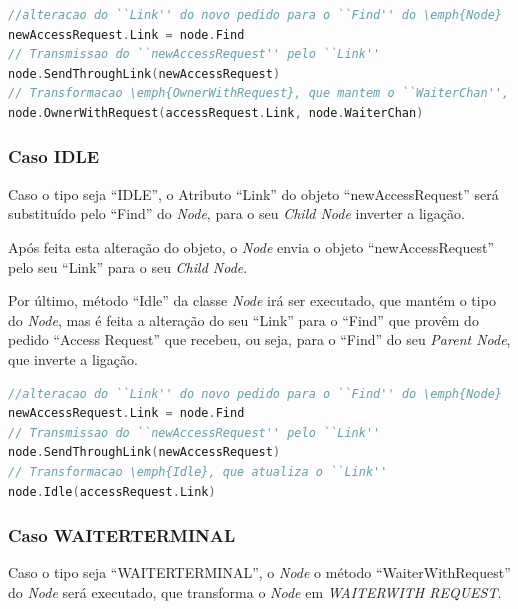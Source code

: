 \begin{lstlisting}[caption={Comportamento do \emph{Node} tipo \emph{Owner With Request} caso receba um pedido \emph{Access Request} no \emph{Channel ``Find''}},language=Go]
//alteracao do ``Link'' do novo pedido para o ``Find'' do \emph{Node}
newAccessRequest.Link = node.Find 
// Transmissao do ``newAccessRequest'' pelo ``Link''
node.SendThroughLink(newAccessRequest) 
// Transformacao \emph{OwnerWithRequest}, que mantem o ``WaiterChan'', mas atualiza o ``Link''
node.OwnerWithRequest(accessRequest.Link, node.WaiterChan)
\end{lstlisting}



\subsubsection*{Caso IDLE}
Caso o tipo seja ``IDLE'',
o Atributo ``Link'' do objeto ``newAccessRequest'' será substituído pelo ``Find'' do \emph{Node}, para o seu \emph{Child Node} inverter a ligação.

Após feita esta alteração do objeto, o \emph{Node} envia o objeto ``newAccessRequest'' pelo seu ``Link'' para o seu \emph{Child Node}.

Por último,  método ``Idle'' da classe \emph{Node} irá ser executado, que mantém o tipo do \emph{Node}, mas
é feita a alteração do seu ``Link'' para o ``Find'' que provêm do pedido ``Access Request'' que recebeu, ou seja, para o ``Find'' do seu \emph{Parent Node}, 
que inverte a ligação.


\begin{lstlisting}[caption={Comportamento do \emph{Node} tipo \emph{Idle} caso receba um pedido \emph{Access Request} no \emph{Channel ``Find''}},language=Go]
//alteracao do ``Link'' do novo pedido para o ``Find'' do \emph{Node}
newAccessRequest.Link = node.Find
// Transmissao do ``newAccessRequest'' pelo ``Link''
node.SendThroughLink(newAccessRequest)
// Transformacao \emph{Idle}, que atualiza o ``Link''
node.Idle(accessRequest.Link)

\end{lstlisting}


\subsubsection*{Caso WAITER\textunderscore TERMINAL}
Caso o tipo seja ``WAITER\textunderscore TERMINAL'', o \emph{Node} o método ``WaiterWithRequest'' do \emph{Node} será executado,
que transforma o \emph{Node} em \emph{WAITER\textunderscore WITH \textunderscore REQUEST}.

